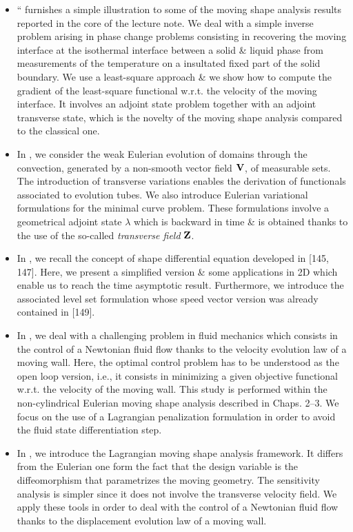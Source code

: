 \documentclass[oneside]{book}
\numberwithin{equation}{section}
\begin{document}
\begin{itemize}
	\item ``\cite[Chap. 2]{Moubachir_Zolesio2006} furnishes a simple illustration to some of the moving shape analysis results reported in the core of the lecture note. We deal with a simple inverse problem arising in phase change problems consisting in recovering the moving interface at the isothermal interface between a solid \& liquid phase from measurements of the temperature on a insultated fixed part of the solid boundary. We use a least-square approach \& we show how to compute the gradient of the least-square functional w.r.t. the velocity of the moving interface. It involves an adjoint state problem together with an adjoint transverse state, which is the novelty of the moving shape analysis compared to the classical one.
	\item In \cite[Chap. 3]{Moubachir_Zolesio2006}, we consider the weak Eulerian evolution of domains through the convection, generated by a non-smooth vector field ${\bf V}$, of measurable sets. The introduction of transverse variations enables the derivation of functionals associated to evolution tubes. We also introduce Eulerian variational formulations for the minimal curve problem. These formulations involve a geometrical adjoint state $\lambda$ which is backward in time \& is obtained thanks to the use of the so-called \textit{transverse field} ${\bf Z}$.
	\item In \cite[Chap. 4]{Moubachir_Zolesio2006}, we recall the concept of shape differential equation developed in [145, 147]. Here, we present a simplified version \& some applications in 2D which enable us to reach the time asymptotic result. Furthermore, we introduce the associated level set formulation whose speed vector version was already contained in [149].
	\item In \cite[Chap. 5]{Moubachir_Zolesio2006}, we deal with a challenging problem in fluid mechanics which consists in the control of a Newtonian fluid flow thanks to the velocity evolution law of a moving wall. Here, the optimal control problem has to be understood as the open loop version, i.e., it consists in minimizing a given objective functional w.r.t. the velocity of the moving wall. This study is performed within the non-cylindrical Eulerian moving shape analysis described in Chaps. 2--3. We focus on the use of a Lagrangian penalization formulation in order to avoid the fluid state differentiation step.
	\item In \cite[Chap. 6]{Moubachir_Zolesio2006}, we introduce the Lagrangian moving shape analysis framework. It differs from the Eulerian one form the fact that the design variable is the diffeomorphism that parametrizes the moving geometry. The sensitivity analysis is simpler since it does not involve the transverse velocity field. We apply these tools in order to deal with the control of a Newtonian fluid flow thanks to the displacement evolution law of a moving wall.

\end{itemize}
\end{document}
